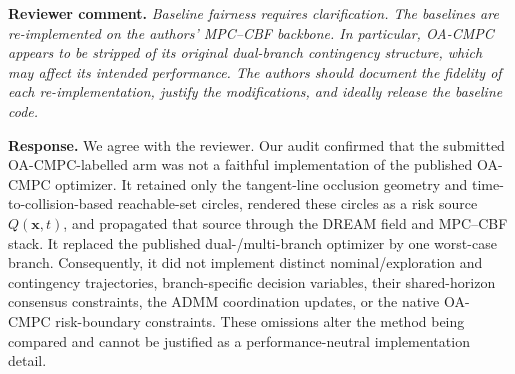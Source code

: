 \providecommand{\BaselineCodeCommit}{\url{https://github.com/SAS-HKU/DREAM/commit/d5f82961eb92ae305741f0f062b842b3a6e25d76}}
\providecommand{\CarlaSceneCount}{five matched scene blocks (40 valid runs)}
\providecommand{\CarlaEmptyShadowFinding}{All retained controllers had 0/5
collisions and 0/5 near collisions in the empty-shadow condition.  DREAM's
mean-speed conservatism tax relative to IDEAM was 1.22~m\,s$^{-1}$ [1.13,
1.32].  Its maximum follower speed loss differed from IDEAM by only
$5.7\times10^{-6}$~m\,s$^{-1}$ [$-1.23\times10^{-3}$,
$1.25\times10^{-3}$], and the paired hard-braking actor count was unchanged.}
\providecommand{\CarlaThreatFinding}{In the true-threat condition, DREAM had
0/5 collisions and 2/5 near collisions, whereas IDEAM had 4/5 and 5/5.  The
ADA-sourced and APF-sourced controls remained collision-free but had 5/5 and
4/5 near collisions.  DREAM increased the mean episode-minimum signed
clearance by 1.19~m [0.89, 1.56], 0.67~m [0.52, 0.82], and 0.19~m [0.02,
0.39] relative to IDEAM, ADA-sourced, and APF-sourced, respectively.}
\providecommand{\CarlaFigureNumber}{\ref{fig:carla-two-condition-profiles}}
\providecommand{\BaselineFidelityTableNumber}{\ref{tab:baseline_fidelity}}

\noindent\textbf{Reviewer comment.}
\emph{Baseline fairness requires clarification. The baselines are
re-implemented on the authors' MPC--CBF backbone. In particular, OA-CMPC
appears to be stripped of its original dual-branch contingency structure,
which may affect its intended performance. The authors should document the
fidelity of each re-implementation, justify the modifications, and ideally
release the baseline code.}

\medskip
\noindent\textbf{Response.}
We agree with the reviewer.  Our audit confirmed that the submitted
OA-CMPC-labelled arm was not a faithful implementation of the published
OA-CMPC optimizer.  It retained only the tangent-line occlusion geometry and
time-to-collision-based reachable-set circles, rendered these circles as a
risk source $Q(\mathbf{x},t)$, and propagated that source through the DREAM
field and MPC--CBF stack.  It replaced the published dual-/multi-branch
optimizer by one worst-case branch.  Consequently, it did not implement
distinct nominal/exploration and contingency trajectories, branch-specific
decision variables, their shared-horizon consensus constraints, the ADMM
coordination updates, or the native OA-CMPC risk-boundary constraints.  These
omissions alter the method being compared and cannot be justified as a
performance-neutral implementation detail.

